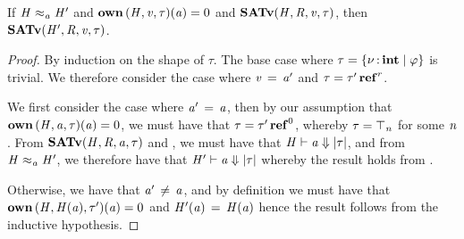 \begin{lemma} %
  \label{lem:heapfor0}
  If $ \mathit{H}   \approx _ {\mathit{a}}   \mathit{H'} $ and $\mathbf{own} \, (  \mathit{H}  ,  \mathit{v}  ,  \tau  )  (  \mathit{a}  )  =  0$ and $ \mathbf{SATv} ( \mathit{H} , \mathit{R} , \mathit{v} , \tau ) $, then $ \mathbf{SATv} ( \mathit{H'} , \mathit{R} , \mathit{v} , \tau ) $.
\end{lemma}
\begin{proof}
  By induction on the shape of $\tau$. The base case where
  $\tau  =   \left\{{  \nu  \operatorname{:} \mathbf{int} \mid  \varphi }\right\} $ is trivial. We therefore consider the case
  where $\mathit{v} \, = \, \mathit{a'}$ and $\tau  =   \tau'  \operatorname{\mathbf{ref}}^{ r } $.

  We first consider the case where $\mathit{a'} \, = \, \mathit{a}$, then by
  our assumption that $\mathbf{own} \, (  \mathit{H}  ,  \mathit{a}  ,  \tau  )  (  \mathit{a}  )  =  0$, we must have that
  $\tau  =   \tau'  \operatorname{\mathbf{ref}}^{ 0 } $, whereby $\tau  =  \top_{\mathit{n}}$ for some $\mathit{n}$.
  From $ \mathbf{SATv} ( \mathit{H} , \mathit{R} , \mathit{a} , \tau ) $ and , we must have that
  $ \mathit{H} \vdash   \mathit{a}  \Downarrow   | \tau |  $,
  and from $ \mathit{H}   \approx _ {\mathit{a}}   \mathit{H'} $, we therefore have that $ \mathit{H'} \vdash   \mathit{a}  \Downarrow   | \tau |  $
  whereby the result holds from .

  Otherwise, we have that $\mathit{a'} \, \neq \, \mathit{a}$, and by definition we must have that
  $\mathbf{own} \, (  \mathit{H}  ,  \mathit{H}  (  \mathit{a}  )  ,  \tau'  )  (  \mathit{a}  )  =  0$ and $\mathit{H'}  (  \mathit{a}  ) \, = \, \mathit{H}  (  \mathit{a}  )$ hence the result follows
  from the inductive hypothesis.
\end{proof}

